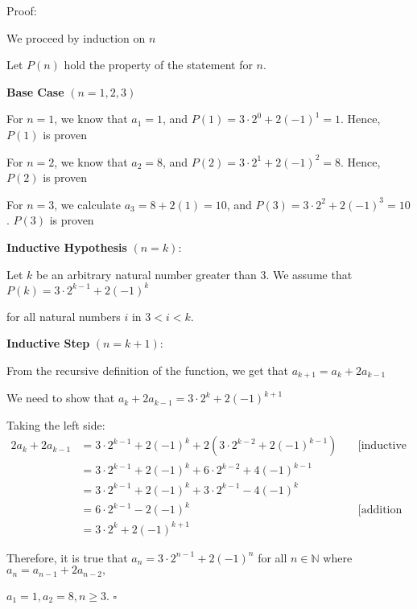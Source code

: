 \documentclass{article} %
\begin{document}
    Proof:

    We proceed by induction on $n$

    Let $P(n)$ hold the property of the statement for $n$.

    \textbf{Base Case} $(n = 1, 2, 3)$

    For $n = 1$, we know that $a_1 = 1$, and $P(1) = 3 \cdot 2^0 + 2(-1)^1 = 1$. Hence, $P(1)$ is proven

    For $n = 2$, we know that $a_2 = 8$, and $P(2) = 3 \cdot 2^1 + 2(-1)^2 = 8$. Hence, $P(2)$ is proven

    For $n = 3$, we calculate $a_3 = 8 + 2(1) = 10$, and $P(3) = 3 \cdot 2^2 + 2(-1)^3 = 10$. $P(3)$ is proven

    \textbf{Inductive Hypothesis} $(n = k)$:

    Let $k$ be an arbitrary natural number greater than 3. We assume that $P(k) = 3 \cdot 2^{k - 1} + 2(-1)^k$

    for all natural numbers $i$ in $3 < i < k$.

    \textbf{Inductive Step} $(n = k + 1)$:

    From the recursive definition of the function, we get that $a_{k + 1} = a_{k} + 2a_{k - 1}$

    We need to show that $a_{k} + 2a_{k - 1} = 3 \cdot 2^{k} + 2(-1)^{k + 1}$

    Taking the left side:
    \begin{alignat*}{2}
        a_{k} + 2a_{k - 1} &= 3 \cdot 2^{k - 1} + 2(-1)^k + 2(3 \cdot 2^{k - 2} + 2(-1)^{k - 1})\ &&\text{[inductive hypothesis]}\\
        &= 3 \cdot 2^{k - 1} + 2(-1)^k + 6 \cdot 2^{k - 2} + 4(-1)^{k - 1}\\
        &= 3 \cdot 2^{k - 1} + 2(-1)^{k} + 3 \cdot 2^{k - 1} - 4(-1)^{k}\\
        &= 6 \cdot 2^{k - 1} - 2(-1)^{k} &&\text{[addition and subtraction]}\\
        &= 3 \cdot 2^{k} + 2(-1)^{k + 1}
    \end{alignat*}

    Therefore, it is true that $a_n = 3 \cdot 2^{n - 1} + 2(-1)^n$ for all $n \in \mathbb{N}$ where $a_n = a_{n - 1} + 2a_{n-2},$
    
    $a_1 = 1, a_2 = 8, n \geq 3$. $\square$

    \newpage

                                                                   
\end{document}
